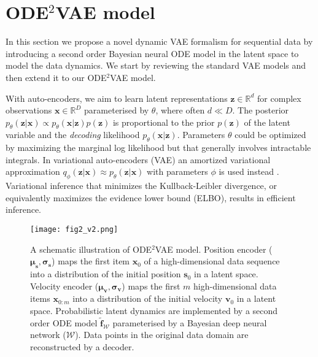 \documentclass{article}
\newcommand{\x}{\mathbf{x}}
\newcommand{\z}{\mathbf{z}}
\renewcommand{\v}{\mathbf{v}}
\newcommand{\f}{\mathbf{f}}
\newcommand{\R}{\mathbb{R}}
\newcommand{\0}{\mathbf{0}}
\newcommand{\s}{\mathbf{s}}
\newcommand{\bs}{{\boldsymbol{\sigma}}}
\newcommand{\bmu}{{\boldsymbol{\mu}}}
\begin{document}
\section{ODE$^2$VAE model}

In this section we propose a novel dynamic VAE formalism for sequential data by introducing a second order Bayesian neural ODE model in the latent space to model the data dynamics. We start by reviewing the standard VAE models and then extend it to our ODE$^2$VAE model.


With auto-encoders, we aim to learn latent representations $\z \in \R^d$ for complex observations $\x \in \R^D$ parameterised by $\theta$, where often $d \ll D$. The posterior $p_\theta(\z | \x) \propto p_\theta(\x | \z) p(\z)$ is proportional to the prior $p(\z)$ of the latent variable and the \emph{decoding} likelihood $p_\theta(\x | \z)$. Parameters $\theta$ could be optimized by maximizing the marginal log likelihood but that generally involves intractable integrals. In variational auto-encoders (VAE) an amortized variational approximation $q_\phi(\z | \x) \approx p_\theta(\z | \x)$ with parameters $\phi$ is used instead 
\citep{jordan1999,kingma2013auto,rezende2014}. Variational inference that minimizes the Kullback-Leibler divergence, or equivalently maximizes the evidence lower bound (ELBO), results in efficient inference.




























\begin{figure}
    \centering
    \texttt{[image: fig2\_v2.png]}
    \caption{A schematic illustration of ODE$^2$VAE model. Position encoder ($\bmu_\s,\bs_\s$) maps the first item $\x_0$ of a high-dimensional data sequence into a distribution of the initial position $\s_0$ in a latent space. Velocity encoder ($\bmu_\v,\bs_\v$) maps the first $m$ high-dimensional data items $\x_{0:m}$ into a distribution of the initial velocity $\v_0$ in a latent space. Probabilistic latent dynamics are implemented by a second order ODE model $\tilde{\f}_\mathcal{W}$ parameterised by a Bayesian deep neural network ($\mathcal{W}$). Data points in the original data domain are reconstructed by a decoder.}
    \label{fig:fig2}  
\end{figure}
\end{document}
